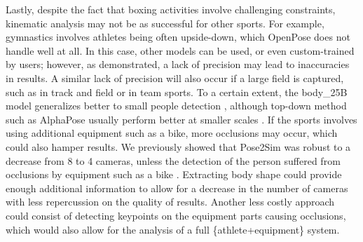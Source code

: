 Lastly, despite the fact that boxing activities involve challenging constraints, kinematic analysis may not be as successful for other sports. For example, gymnastics involves athletes being often upside-down, which OpenPose does not handle well at all. In this case, other models can be used, or even custom-trained by users; however, as demonstrated, a lack of precision may lead to inaccuracies in results. A similar lack of precision will also occur if a large field is captured, such as in track and field or in team sports. To a certain extent, the body\_25B model generalizes better to small people detection \cite{Hidalgo2019}, although top-down method such as AlphaPose \cite{Fang2017} usually perform better at smaller scales \cite{Cao2019,Bridgeman2019}. If the sports involves using additional equipment such as a bike, more occlusions may occur, which could also hamper results. We previously showed that Pose2Sim was robust to a decrease from 8 to 4 cameras, unless the detection of the person suffered from occlusions by equipment such as a bike \cite{Pagnon2021}. Extracting body shape could provide enough additional information to allow for a decrease in the number of cameras with less repercussion on the quality of results. Another less costly approach could consist of detecting keypoints on the equipment parts causing occlusions, which would also allow for the analysis of a full \{athlete+equipment\} system. 















